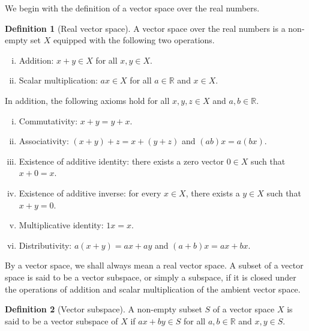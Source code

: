 \documentclass[english, 12pt, a4paper, sci, utf8, a-2b, online]{aaltothesis}
\theoremstyle{definition}
\newtheorem{definition}{Definition}[section]
\theoremstyle{plain}
\numberwithin{equation}{section}
\begin{document}
We begin with the definition of a vector space over the real numbers.
\begin{definition}[Real vector space]
    \label{def:vectorspace}
    A vector space over the real numbers is a non-empty set $X$ equipped
    with the following two operations.
    \begin{enumerate}[(i)]
        \item Addition: $x+y \in X$ for all $x,y \in X$.
        \item Scalar multiplication: $a x \in X$ for all $a \in \mathbb{R}$
        and $x \in X$.
    \end{enumerate}
    In addition, the following axioms hold for all $x,y,z \in X$
    and $a,b \in \mathbb{R}$.
    \begin{enumerate}[(i)]
        \item Commutativity: $x+y=y+x$.
        \item Associativity: $(x+y)+z=x+(y+z)$ and $(ab)x=a(bx)$.
        \item Existence of additive identity: there exists a zero vector $0 \in X$
        such that $x+0=x$.
        \item Existence of additive inverse: for every $x \in X$, there exists
        a $y \in X$ such that $x+y=0$.
        \item Multiplicative identity: $1x=x$.
        \item Distributivity: $a(x+y)=ax+ay$ and $(a+b)x=ax+bx$.
    \end{enumerate}
\end{definition}
By a vector space, we shall always mean a real vector space.
A subset of a vector space is said to be a vector subspace,
or simply a subspace, if it is closed under the operations of addition
and scalar multiplication of the ambient vector space.
\begin{definition}[Vector subspace]
    \label{def:subspace}
    A non-empty subset $S$ of a vector space $X$
    is said to be a vector subspace of $X$
    if $ax+by \in S$ for all $a,b \in \mathbb{R}$ and $x,y \in S$.
\end{definition}
\end{document}
